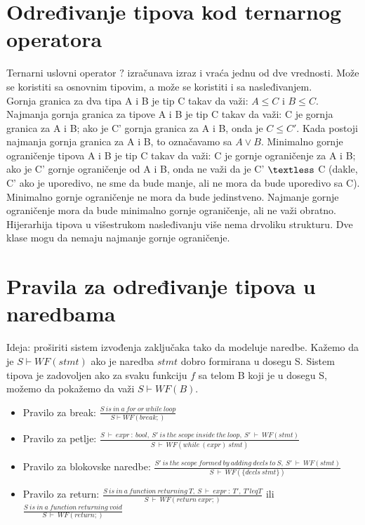 \documentclass[10pt]{extarticle}
\begin{document}
\section{Određivanje tipova kod ternarnog operatora}
\noindent
Ternarni uslovni operator $?$ izračunava izraz i vraća jednu od dve vrednosti. Može se koristiti sa osnovnim tipovim, a može se koristiti i sa nasleđivanjem. \\
Gornja granica za dva tipa A i B je tip C takav da važi: $A \leq C$ i $B \leq C$. Najmanja gornja granica za tipove A i B je tip C takav da važi: C je gornja granica za A i B; ako je C' gornja granica za A i B, onda je $C \leq C'$. Kada postoji najmanja gornja granica za A i B, to označavamo sa $A \vee B$.
Minimalno gornje ograničenje tipova A i B je tip C takav da važi: C je gornje ograničenje za A i B; ako je C' gornje ograničenje od A i B, onda ne važi da je C' $\textless$ C (dakle, C' ako je uporedivo, ne sme da bude manje, ali ne mora da bude uporedivo sa C).
Minimalno gornje ograničenje ne mora da bude jedinstveno. Najmanje gornje ograničenje mora da bude minimalno gornje ograničenje, ali ne važi obratno. \\
Hijerarhija tipova u višestrukom nasleđivanju više nema drvoliku strukturu. Dve klase mogu da nemaju najmanje gornje ograničenje.

\section{Pravila za određivanje tipova u naredbama}
\noindent
Ideja: proširiti sistem izvođenja zaključaka tako da modeluje naredbe. Kažemo da je $S \vdash WF(stmt)$ ako je naredba $stmt$ dobro formirana u dosegu S. Sistem tipova je zadovoljen ako za svaku funkciju $f$ sa telom B koji je u dosegu S, možemo da pokažemo da važi $S \vdash WF(B)$. 
\begin{itemize}
    \item Pravilo za break: $\frac{S\ is\ in\ a\ for\ or\ while\ loop}{S \vdash WF(break;)}$
    \item Pravilo za petlje: $\frac{S\ \vdash\ expr\ :\ bool,\ S'\ is\ the\ scope\ inside\ the\ loop,\ S'\ \vdash\ WF(stmt)}{S\ \vdash\ WF(while\ (expr)\ stmt)}$
    \item Pravilo za blokovske naredbe: $\frac{S'\ is\ the\ scope\ formed\ by\ adding\ decls\ to\ S,\ S'\ \vdash\ WF(stmt)}{S\ \vdash\ WF(\{decls\ stmt\})}$
    \item Pravilo za return: 
    $\frac{S\ is\ in\ a\ function\ returning\ T,\ S\ \vdash\ expr\ :\ T',\ T' leq T}{S\ \vdash\ WF(return\ expr;)}$ ili
    $\frac{S\ is\ in\ a\ function\ returning\ void}{S\ \vdash\ WF(return;)}$
\end{itemize}
\end{document}
